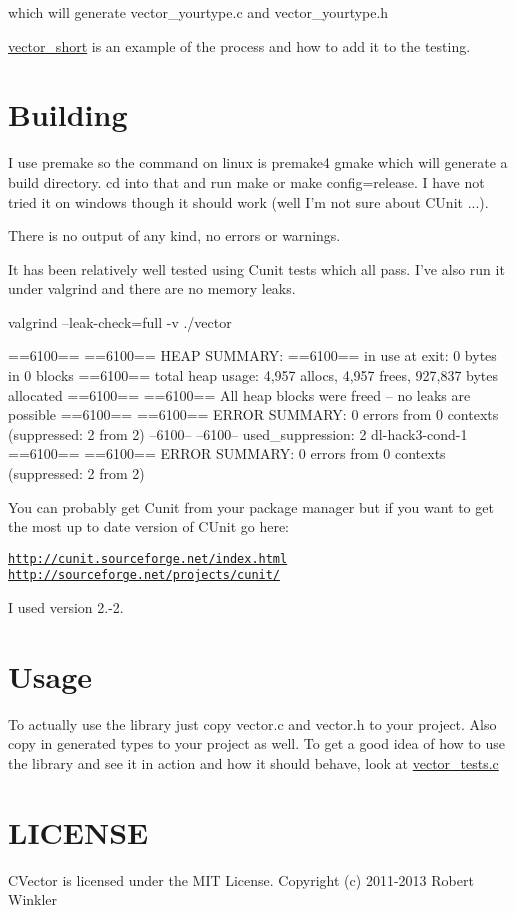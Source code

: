 which will generate vector\-\_\-yourtype.\-c and vector\-\_\-yourtype.\-h

\hyperlink{structvector__short}{vector\-\_\-short} is an example of the process and how to add it to the testing.\hypertarget{index_Building}{}\section{Building}\label{index_Building}
I use premake so the command on linux is premake4 gmake which will generate a build directory. cd into that and run make or make config=release. I have not tried it on windows though it should work (well I'm not sure about C\-Unit ...).

There is no output of any kind, no errors or warnings.

It has been relatively well tested using Cunit tests which all pass. I've also run it under valgrind and there are no memory leaks.

valgrind --leak-\/check=full -\/v ./vector


\begin{DoxyPre}
==6100== 
==6100== HEAP SUMMARY:
==6100==     in use at exit: 0 bytes in 0 blocks
==6100==   total heap usage: 4,957 allocs, 4,957 frees, 927,837 bytes allocated
==6100== 
==6100== All heap blocks were freed -- no leaks are possible
==6100== 
==6100== ERROR SUMMARY: 0 errors from 0 contexts (suppressed: 2 from 2)
--6100-- 
--6100-- used\_suppression:      2 dl-hack3-cond-1
==6100== 
==6100== ERROR SUMMARY: 0 errors from 0 contexts (suppressed: 2 from 2)
\end{DoxyPre}


You can probably get Cunit from your package manager but if you want to get the most up to date version of C\-Unit go here\-:

\href{http://cunit.sourceforge.net/index.html}{\tt http\-://cunit.\-sourceforge.\-net/index.\-html} \href{http://sourceforge.net/projects/cunit/}{\tt http\-://sourceforge.\-net/projects/cunit/}

I used version 2.-\/2.\hypertarget{index_Usage}{}\section{Usage}\label{index_Usage}
To actually use the library just copy vector.\-c and vector.\-h to your project. Also copy in generated types to your project as well. To get a good idea of how to use the library and see it in action and how it should behave, look at \hyperlink{vector__tests_8c}{vector\-\_\-tests.\-c}\hypertarget{index_LICENSE}{}\section{L\-I\-C\-E\-N\-S\-E}\label{index_LICENSE}
C\-Vector is licensed under the M\-I\-T License. Copyright (c) 2011-\/2013 Robert Winkler

